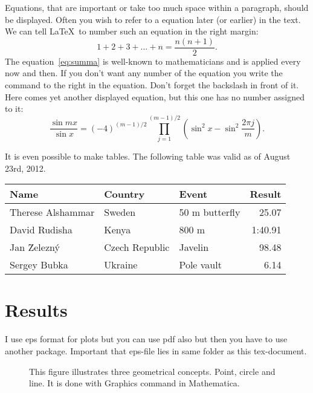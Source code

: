 \documentclass[11pt,a4paper]{article}
\begin{document}
  Equations, that are important or take too much space within
  a paragraph, should be displayed. Often you wish to refer to
  a equation later (or earlier) in the text. We can tell
  \LaTeX\ to number such an equation in the right margin:
  \begin{equation}
    \label{eq:summa}
    1 + 2 + 3 + \dots + n = \frac{n(n + 1)}{2}.
  \end{equation}
  The equation~\eqref{eq:summa} is well-known to mathematicians
  and is applied every now and then. If you don't want any number
	of the equation you write the command  to the right in the equation.
	Don't forget the backslash in front of it.
	Here comes yet another displayed equation, but this one has
  no number assigned to it:
  \[
    \frac{\sin m x}{\sin x}
    = (-4)^{(m - 1)/2} \prod_{j = 1}^{(m - 1)/2}
    \left(\sin^2 x - \sin^2 \frac{2 \pi j}{m}\right).
  \]
	
	 It is even possible to make tables. The following table was valid as of August 23rd, 2012.
  \begin{center}
    \begin{tabular}{lllr}
      \hline
      \textbf{Name}  & \textbf{Country} &
      \textbf{Event} & \textbf{Result}  \\
      \hline
      Therese Alshammar & Sweden         & 50 m butterfly
        &   25.07 \\
      David Rudisha     & Kenya          & 800 m
        & 1:40.91 \\
      Jan \u{Z}elezn\'y & Czech Republic & Javelin
        &   98.48 \\
      Sergey Bubka      & Ukraine        & Pole vault
        &    6.14 \\
      \hline
    \end{tabular}
  \end{center}

\section{Results}

I use eps format for plots but you can use pdf also but then you have to
use another package.
Important that eps-file lies in same folder as this tex-document.
\begin{figure}[tbph]
\caption{ This figure illustrates three geometrical concepts.
Point, circle and line. It is done with Graphics command in Mathematica.}
\end{figure}
\end{document}
